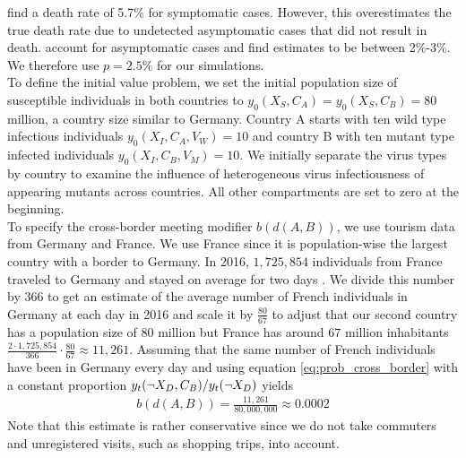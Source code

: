 \cite{Baud.2020} find a death rate of 5.7\% for symptomatic cases. However, this overestimates the true death rate due to undetected asymptomatic cases that did not result in death. \cite{Wu.2020} account for asymptomatic cases and find estimates to be between 2\%-3\%. We therefore use $p=2.5\%$ for our simulations.\\

To define the initial value problem, we set the initial population size of susceptible individuals in both countries to $y_0(X_S, C_A) = y_0(X_S, C_B) = 80$ million, a country size similar to Germany. Country A starts with ten wild type infectious individuals $y_0(X_I, C_A, V_W) = 10$ and country B with ten mutant type infected individuals $y_0(X_I, C_B, V_M) = 10$. We initially separate the virus types by country to examine the influence of heterogeneous virus infectiousness of appearing mutants across countries. All other compartments are set to zero at the beginning. \\

To specify the cross-border meeting modifier $b(d(A,B))$, we use tourism data from Germany and France. We use France since it is population-wise the largest country with a border to Germany. In 2016, $1,725,854$ individuals from France traveled to Germany and stayed on average for two days \citep{SBA.2017}. We divide this number by 366 to get an estimate of the average number of French individuals in Germany at each day in 2016 and scale it by $\frac{80}{67}$ to adjust that our second country has a population size of 80 million but France has around 67 million inhabitants $\frac{2 \cdot 1,725,854}{366} \cdot \frac{80}{67
} \approx 11,261$. Assuming that the same number of French individuals have been in Germany every day and using equation \eqref{eq:prob_cross_border} with a constant proportion $y_t(\neg X_D, C_B) / y_t(\neg X_D)$ yields 
\begin{align*}
b(d(A, B)) = \frac{11,261}{80,000,000} \approx 0.0002
\end{align*}
Note that this estimate is rather conservative since we do not take commuters and unregistered visits, such as shopping trips, into account. \\

